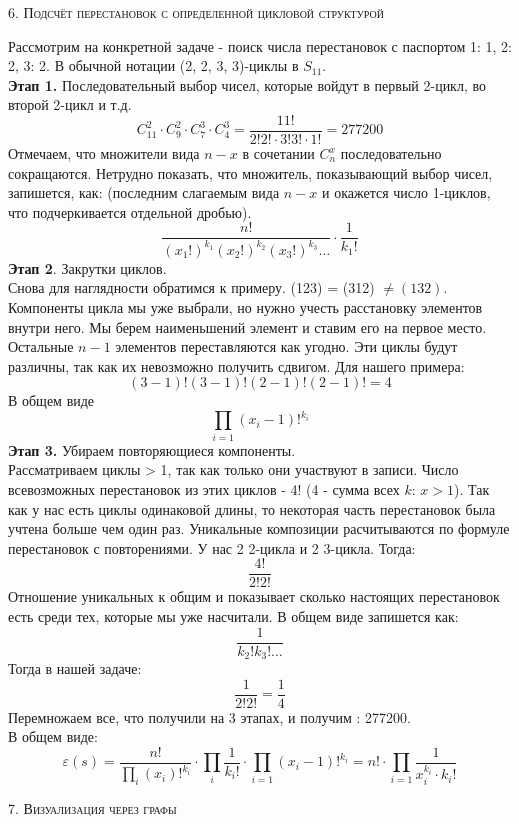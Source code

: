 \documentclass[a4paper,12pt]{article}
\begin{document}
\begin{center}
    \textsc{6. Подсчёт перестановок с определенной цикловой структурой}
\end{center}
Рассмотрим на конкретной задаче - поиск числа перестановок с паспортом {1: 1, 2: 2, 3: 2}. В обычной нотации (2, 2, 3, 3)-циклы в $S_{11}$. \\
\textbf{Этап 1.} Последовательный выбор чисел, которые войдут в первый 2-цикл, во второй 2-цикл и т.д. \\
\[ C^2_{11} \cdot C_9^2 \cdot C_7^3 \cdot C_4^3 = \frac{11!}{2! 2! \cdot 3! 3! \cdot 1!} = 277200  \]
Отмечаем, что множители вида $n-x$ в сочетании $C^x_n$ последовательно сокращаются. Нетрудно показать, что множитель, показывающий выбор чисел, запишется, как: (последним слагаемым вида $n-x$ и окажется число 1-циклов, что подчеркивается отдельной дробью).  
\[ \frac{n!}{(x_1!)^{k_1}(x_2!)^{k_2}(x_3!)^{k_3}\dots} \cdot \frac{1}{k_1!}\]
\textbf{Этап 2}. Закрутки циклов. \\
Снова для наглядности обратимся к примеру. (123) = (312) $\neq (132)$. Компоненты цикла мы уже выбрали, но нужно учесть расстановку элементов внутри него. Мы берем наименьшений элемент и ставим его на первое место. Остальные $n-1$ элементов переставляются как угодно. Эти циклы будут различны, так как их невозможно получить сдвигом. Для нашего примера: \\
\[ (3-1)!(3-1)!(2-1)!(2-1)! = 4 \]
В общем виде
\[\prod_{i=1}(x_i-1)!^{k_i}\]
\textbf{Этап 3.} Убираем повторяющиеся компоненты. \\
Рассматриваем циклы > 1, так как только они участвуют в записи. Число всевозможных перестановок из этих циклов - 4! (4 - сумма всех $k$: $x > 1$). Так как у нас есть циклы одинаковой длины, то некоторая часть перестановок была учтена больше чем один раз. Уникальные композиции расчитываются по формуле перестановок с повторениями. У нас 2 2-цикла и 2 3-цикла. Тогда:
\[\frac{4!}{2!2!} \]
Отношение уникальных к общим и показывает сколько настоящих перестановок есть среди тех, которые мы уже насчитали. В общем виде запишется как:
\[\frac{1}{k_2!k_3!\dots} \]
Тогда в нашей задаче: 
\[ \frac{1}{2! 2!} = \frac{1}{4}\]
Перемножаем все, что получили на 3 этапах, и получим : 277200. \\
В общем виде:
\[ \varepsilon(s) = \frac{n!}{\prod_i (x_i)!^{k_i}} \cdot \prod_i \frac{1}{k_i!} \cdot \prod_{i=1}(x_i-1)!^{k_i} = n! \cdot \prod_{i=1} \frac{1}{x_i^{k_i}\cdot k_i!} \]
\newpage
\begin{center}
    \textsc{7. Визуализация через графы}
\end{center}
\end{document}
